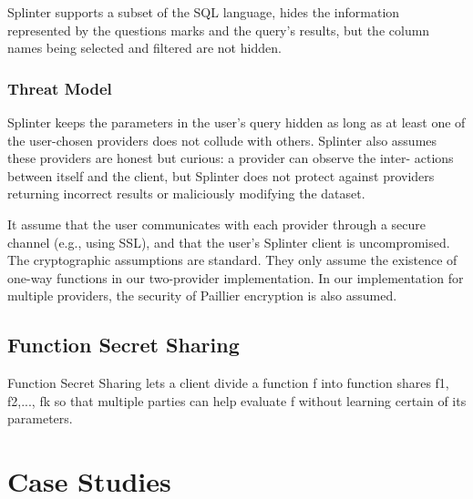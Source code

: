 \documentclass[12pt,a4paper]{article}
\begin{document}
\begin{multicols}{2}
Splinter supports a subset of the SQL language, 
hides the information represented by the questions 
marks and the query’s results, but the column names 
being selected and filtered are not hidden.
\subsubsection{Threat Model}
Splinter keeps the parameters in the user’s query 
hidden as long as at least one of the user-chosen 
providers does not collude with others. Splinter 
also assumes these providers are honest but 
curious: a provider can observe the inter- actions 
between itself and the client, but Splinter does 
not protect against providers returning incorrect 
results or maliciously modifying the dataset.

It assume that the user communicates with each 
provider through a secure channel (e.g., using 
SSL), and that the user’s Splinter client is 
uncompromised. The cryptographic assumptions are 
standard. They only assume the existence of one-way 
functions in our two-provider implementation. In 
our implementation for multiple providers, the 
security of Paillier encryption is also 
assumed.
\subsection{Function Secret Sharing}
Function Secret Sharing lets a client divide a function f into function shares f1, f2,..., fk so that multiple parties can help evaluate f without learning certain of its parameters.


\section{Case Studies}

\end{multicols}
\end{document}
